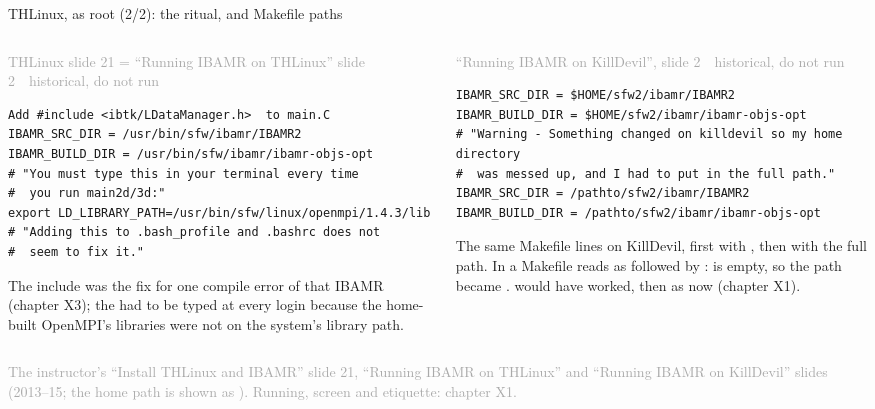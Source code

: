 \documentclass[aspectratio=169,11pt]{beamer}
\newcommand{\sourcecredit}[1]{\vfill\begin{flushright}\tiny\textcolor{DarkGray}{#1}\end{flushright}}
\newcommand{\hist}[1]{{\tiny\sffamily\textcolor{DarkGray}{#1\ \textbullet\ historical, do not run}}\par\nointerlineskip\vspace{0.3mm}}
\begin{document}
\begin{frame}[fragile]{THLinux, as root (2/2): the  ritual, and Makefile paths}
\label{fr:throot2}
\begin{columns}[T,onlytextwidth]
\begin{column}{0.5\textwidth}
\hist{THLinux slide 21 = ``Running IBAMR on THLinux'' slide 2}
\begin{lstlisting}[style=hist]
Add #include <ibtk/LDataManager.h>  to main.C
IBAMR_SRC_DIR = /usr/bin/sfw/ibamr/IBAMR2
IBAMR_BUILD_DIR = /usr/bin/sfw/ibamr/ibamr-objs-opt
# "You must type this in your terminal every time
#  you run main2d/3d:"
export LD_LIBRARY_PATH=/usr/bin/sfw/linux/openmpi/1.4.3/lib
# "Adding this to .bash_profile and .bashrc does not
#  seem to fix it."
\end{lstlisting}
\vspace{1mm}
\footnotesize The include was the fix for one compile error of that IBAMR (chapter X3); the  had to be typed at every login because the home-built OpenMPI's libraries were not on the system's library path.
\end{column}
\begin{column}{0.47\textwidth}
\hist{``Running IBAMR on KillDevil'', slide 2}
\begin{lstlisting}[style=hist]
IBAMR_SRC_DIR = $HOME/sfw2/ibamr/IBAMR2
IBAMR_BUILD_DIR = $HOME/sfw2/ibamr/ibamr-objs-opt
# "Warning - Something changed on killdevil so my home directory
#  was messed up, and I had to put in the full path."
IBAMR_SRC_DIR = /pathto/sfw2/ibamr/IBAMR2
IBAMR_BUILD_DIR = /pathto/sfw2/ibamr/ibamr-objs-opt
\end{lstlisting}
\vspace{1mm}
\footnotesize The same Makefile lines on KillDevil, first with , then with the full path. In a Makefile  reads as  followed by :  is empty, so the path became .  would have worked, then as now (chapter X1).
\end{column}
\end{columns}
\sourcecredit{The instructor's ``Install THLinux and IBAMR'' slide 21, ``Running IBAMR on THLinux'' and ``Running IBAMR on KillDevil'' slides (2013--15; the home path is shown as \code{/pathto}). Running, screen and etiquette: chapter X1.}
\end{frame}
\end{document}
